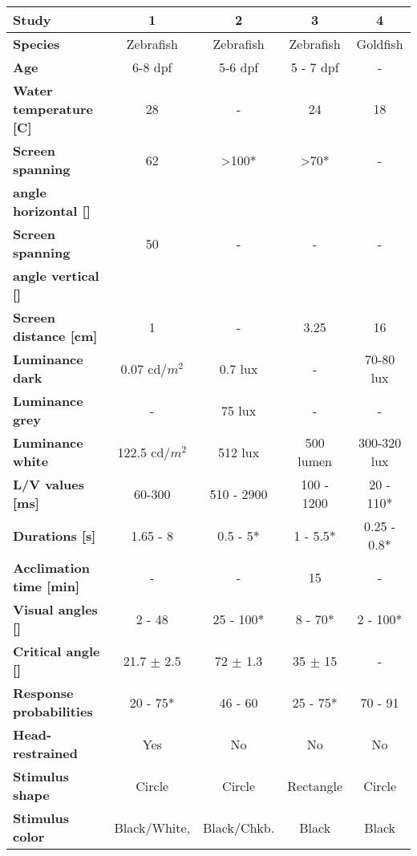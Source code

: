 \documentclass[a4paper,10pt,hidelinks]{scrreprt}
\begin{document}
	\begin{table} [!th]
		\begin{center}
			\begin{tabular}{l|c|c|c|c}
				\textbf{Study} & \textbf{1} & \textbf{2} & \textbf{3} & \textbf{4}\\
				\hline
				\textbf{Species} & Zebrafish & Zebrafish & Zebrafish & Goldfish\\
				\textbf{Age} & 6-8 dpf & 5-6 dpf & 5 - 7 dpf & -\\
				\textbf{Water temperature [\textdegree C]} & 28  & - & 24  & 18 \\
				\textbf{Screen spanning} & 62 & >100* & >70* & -\\
				\textbf{angle horizontal [\textdegree]} & & & & \\
				\textbf{Screen spanning} & 50 & - & - & -\\
				\textbf{angle vertical [\textdegree]} & & & & \\
				\textbf{Screen distance [cm]} & 1 & - & 3.25 & 16\\
				\textbf{Luminance dark} & 0.07 cd/$m^2$ & 0.7 lux & - & 70-80 lux\\
				\textbf{Luminance grey} & - & 75 lux & - & -\\
				\textbf{Luminance white} & 122.5 cd/$m^2$ & 512 lux & 500 lumen & 300-320 lux\\
				\textbf{L/V values [ms]} & 60-300 \dag & 510 - 2900 \dag & 100 - 
				1200 & 20 - 110*\\
				\textbf{Durations [s]} & 1.65 - 8 & 0.5 - 5* & 1 - 5.5* & 0.25 - 0.8*\\
				\textbf{Acclimation time [min]} & - & - & 15 & -\\
				\textbf{Visual angles [\textdegree]} & 2 - 48 & 25 - 100* & 8 - 70* & 2 - 100*\\
				\textbf{Critical angle [\textdegree]} & 21.7 $\pm$ 2.5 & 72 $\pm$ 1.3 & 35 $\pm$ 15 
				& -\\
				\textbf{Response probabilities} & 20 - 75* & 46 - 60 & 25 - 75* & 70 - 91\\
				\textbf{Head-restrained} & Yes & No & No & No\\
				\textbf{Stimulus shape} & Circle & Circle & Rectangle & Circle\\
				\textbf{Stimulus color} & Black/White, & Black/Chkb. & Black & Black\\

\end{tabular}
\end{center}
\end{table}
\end{document}
